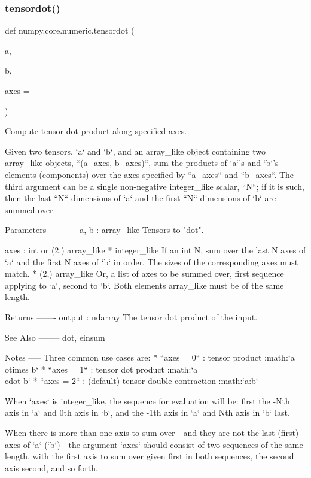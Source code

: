 \subsubsection{\texorpdfstring{tensordot()}{tensordot()}}
{\footnotesize\ttfamily def numpy.\+core.\+numeric.\+tensordot (\begin{DoxyParamCaption}\item[{}]{a,  }\item[{}]{b,  }\item[{}]{axes = {} }\end{DoxyParamCaption})}

\begin{DoxyVerb}Compute tensor dot product along specified axes.

Given two tensors, `a` and `b`, and an array_like object containing
two array_like objects, ``(a_axes, b_axes)``, sum the products of
`a`'s and `b`'s elements (components) over the axes specified by
``a_axes`` and ``b_axes``. The third argument can be a single non-negative
integer_like scalar, ``N``; if it is such, then the last ``N`` dimensions
of `a` and the first ``N`` dimensions of `b` are summed over.

Parameters
----------
a, b : array_like
    Tensors to "dot".

axes : int or (2,) array_like
    * integer_like
      If an int N, sum over the last N axes of `a` and the first N axes
      of `b` in order. The sizes of the corresponding axes must match.
    * (2,) array_like
      Or, a list of axes to be summed over, first sequence applying to `a`,
      second to `b`. Both elements array_like must be of the same length.

Returns
-------
output : ndarray
    The tensor dot product of the input.

See Also
--------
dot, einsum

Notes
-----
Three common use cases are:
    * ``axes = 0`` : tensor product :math:`a\\otimes b`
    * ``axes = 1`` : tensor dot product :math:`a\\cdot b`
    * ``axes = 2`` : (default) tensor double contraction :math:`a:b`

When `axes` is integer_like, the sequence for evaluation will be: first
the -Nth axis in `a` and 0th axis in `b`, and the -1th axis in `a` and
Nth axis in `b` last.

When there is more than one axis to sum over - and they are not the last
(first) axes of `a` (`b`) - the argument `axes` should consist of
two sequences of the same length, with the first axis to sum over given
first in both sequences, the second axis second, and so forth.


\end{DoxyVerb}
